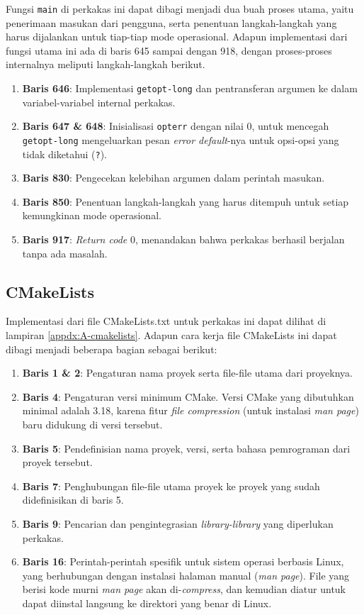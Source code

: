Fungsi \verb|main| di perkakas ini dapat dibagi menjadi dua buah proses utama, yaitu penerimaan masukan dari pengguna, serta penentuan langkah-langkah yang harus dijalankan untuk tiap-tiap mode operasional. Adapun implementasi dari fungsi utama ini ada di baris 645 sampai dengan 918, dengan proses-proses internalnya meliputi langkah-langkah berikut.

\begin{enumerate}
	\item \textbf{Baris 646}: Implementasi \verb|getopt-long| dan pentransferan argumen ke dalam variabel-variabel internal perkakas.
	\item \textbf{Baris 647 \& 648}: Inisialisasi \verb|opterr| dengan nilai 0, untuk mencegah \verb|getopt-long| mengeluarkan pesan \textit{error default}-nya untuk opsi-opsi yang tidak diketahui (\textquotesingle\verb|?|\textquotesingle). 
	\item \textbf{Baris 830}: Pengecekan kelebihan argumen dalam perintah masukan.
	\item \textbf{Baris 850}: Penentuan langkah-langkah yang harus ditempuh untuk setiap kemungkinan mode operasional.
	\item \textbf{Baris 917}: \textit{Return code} 0, menandakan bahwa perkakas berhasil berjalan tanpa ada masalah.
\end{enumerate}

\subsection{CMakeLists}
\label{sec:testing-implementation-cmakelists}

Implementasi dari file CMakeLists.txt untuk perkakas ini dapat dilihat di lampiran \ref{appdx:A-cmakelists}. Adapun cara kerja file CMakeLists ini dapat dibagi menjadi beberapa bagian sebagai berikut:

\begin{enumerate}
	\item \textbf{Baris 1 \& 2}: Pengaturan nama proyek serta file-file utama dari proyeknya.
	\item \textbf{Baris 4}: Pengaturan versi minimum CMake. Versi CMake yang dibutuhkan minimal adalah 3.18, karena fitur \textit{file compression} (untuk instalasi \textit{man page}) baru didukung di versi tersebut.
	\item \textbf{Baris 5}: Pendefinisian nama proyek, versi, serta bahasa pemrograman dari proyek tersebut.
	\item \textbf{Baris 7}: Penghubungan file-file utama proyek ke proyek yang sudah didefinisikan di baris 5.
	\item \textbf{Baris 9}: Pencarian dan pengintegrasian \textit{library-library} yang diperlukan perkakas.
	\item \textbf{Baris 16}: Perintah-perintah spesifik untuk sistem operasi berbasis Linux, yang berhubungan dengan instalasi halaman manual (\textit{man page}). File yang berisi kode murni \textit{man page} akan di-\textit{compress}, dan kemudian diatur untuk dapat diinstal langsung ke direktori yang benar di Linux.
\end{enumerate}

